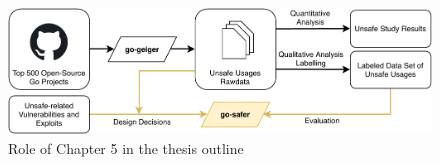\begin{figure}[htp!]
    \includegraphics[width=\textwidth]{assets/figures/chapter5/outline5.pdf}
    \caption{Role of Chapter 5 in the thesis outline}
    \label{fig:outline5}
\end{figure}
